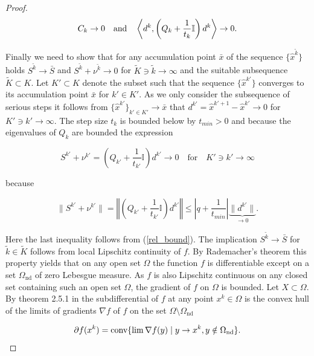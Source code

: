 \begin{proof}
	\begin{equation*}
		C_k \to 0 \quad \text{and} \quad \left\langle d^k,\left(Q_k+\frac{1}{t_k}\mathbb{I}\right)d^k\right\rangle \to 0.
	\end{equation*}
	
	Finally we need to show that for any accumulation point \(\bar{x}\) of the sequence \(\{\hat{x}^{\tilde{k}}\}\) holds \(S^{\tilde{k}} \to \bar{S}\) and \(S^{\tilde{k}}+\nu^{\tilde{k}} \to 0\) for \(\tilde{K} \ni {\tilde{k}} \to \infty\) and the suitable subsequence \(\tilde{K} \subset K\).
Let \({K'} \subset K\) denote the subset such that the sequence \(\{\hat{x}^{k'}\}\) converges to its accumulation point \(\bar{x}\) for \(k' \in K'\). %
As we only consider the subsequence of serious steps it follows from \(\{\hat{x}^{k'}\}_{k' \in K'} \to \bar{x}\) that  \(d^{{k'}} = \hat{x}^{{k'}+1}-\hat{x}^{{k'}} \to 0\) for \({K'} \ni {k'} \to \infty \). The step size \(t_k\) is bounded below by \(t_{min} > 0\) and because the eigenvalues of \(Q_k\) are bounded the expression 
	
	\begin{equation*}
	 S^{{k'}} + \nu^{{k'}} = \left(Q_{{k'}}+\frac{1}{t_{{k'}}}\mathbb{I} \right)d^{{k'}}  \to 0 \quad \text{for} \quad {K'} \ni {k'} \to \infty
	\end{equation*}
	
	because 
	
	\[ \lVert S^{{k'}} + \nu^{{k'}} \rVert = \left\Vert\left(Q_{{k'}}+\frac{1}{t_{{k'}}}\mathbb{I}\right)d^{{k'}} \right\Vert \leq \left \vert q + \frac{1}{t_{min}}\right\vert \underbrace{\|d^{{k'}}\|}_{\to 0}.\]
	
	Here the last inequality follows from (\ref{rel_bound}).
	The implication \(S^{\tilde{k}} \to \bar{S}\) for \({\tilde{k}} \in \tilde{K}\) follows from local Lipschitz continuity of \(f\).
	By Rademacher's theorem this property yields that on any open set \(\Omega\) the function \(f\) is differentiable except on a set \(\Omega_{\text{nd}}\) of zero Lebesgue measure. As \(f\) is also Lipschitz continuous on any closed set containing such an open set \(\Omega\), the gradient of \(f\) on \(\Omega\) is bounded.
	Let \(X \subset \Omega\). By theorem 2.5.1 in \cite[p. 63]{Clarke1990} the subdifferential of \(f\) at any point \(x^k \in \Omega\) is the convex hull of the limits of gradients \(\nabla f\) of \(f\) on the set \(\Omega\setminus \Omega_{\text{nd}}\)
	
		\[ \partial f(x^k) = \text{conv}\{\lim \nabla f(y) \mid y \to x^k, y \notin \Omega_{\text{nd}}\}. \]
		

\end{proof}
